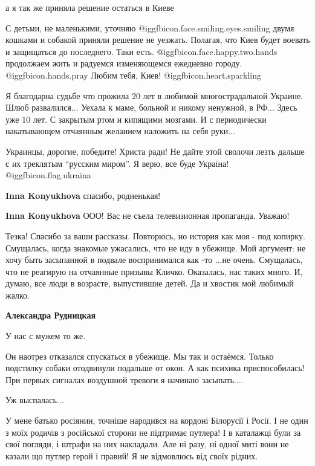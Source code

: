 \begin{itemize}
а я так же приняла решение остаться в Киеве


С детьми, не маленькими, уточняю @igg{fbicon.face.smiling.eyes.smiling}  двумя кошками и собакой приняли решение не
уезжать. Полагая, что Киев будет воевать и защищаться до последнего. Таки есть.
 @igg{fbicon.face.happy.two.hands} продолжаем жить и радуемся изменяющемся ежедневно городу.  @igg{fbicon.hands.pray}  Любим тебя,
Киев! @igg{fbicon.heart.sparkling} 


Я благодарна судьбе что прожила 20 лет в любимой многострадальной Украине. Шлюб
развалился... Уехала к маме, больной и никому ненужной, в РФ... Здесь уже 10 лет. С
закрытым ртом и кипящими мозгами. И с периодически накатывающем отчаянным
желанием наложить на себя руки...

Украинцы, дорогие, победите! Христа ради! Не дайте этой сволочи лезть дальше с
их треклятым \enquote{русским миром}. Я верю, все буде Украiна! @igg{fbicon.flag.ukraina}

\begin{itemize} %
\textbf{Inna Konyukhova} спасибо, родненькая!

\textbf{Inna Konyukhova} ООО! Вас не съела телевизионная пропаганда. Уважаю!


Тезка! Спасибо за ваши рассказы. Повторюсь, но история как моя - под копирку.
Смущалась, когда знакомые ужасались, что не иду в убежище. Мой аргумент: не
хочу быть засыпанной в подвале воспринимался как -то ...не очень. Смущалась,
что не реагирую на отчаянные призывы Кличко. Оказалась, нас таких много.
И, думаю, все люди в возрасте, выпустившие детей. Да и хвостик мой любимый
жалко.

\textbf{Александра Рудницкая}

У нас с мужем то же.

Он наотрез отказался спускаться в убежище. Мы так и остаёмся. Только подстилку
собаки отодвинули подальше от окон. А как психика приспособилась! При первых
сигналах воздушной тревоги я начинаю засыпать....

Уж выспалась...
\end{itemize} %


У мене батько росіянин, точніше народився на кордоні Білорусії і Росії. І не
один з моїх родичів з російської сторони не підтримає путлера! І в каталажці
були за свої погляди, і штрафи на них накладали. Але ні разу, ні одної миті
вони не казали що путлер герой і правий! Я не відмовлюсь від своїх рідних.


\end{itemize}
